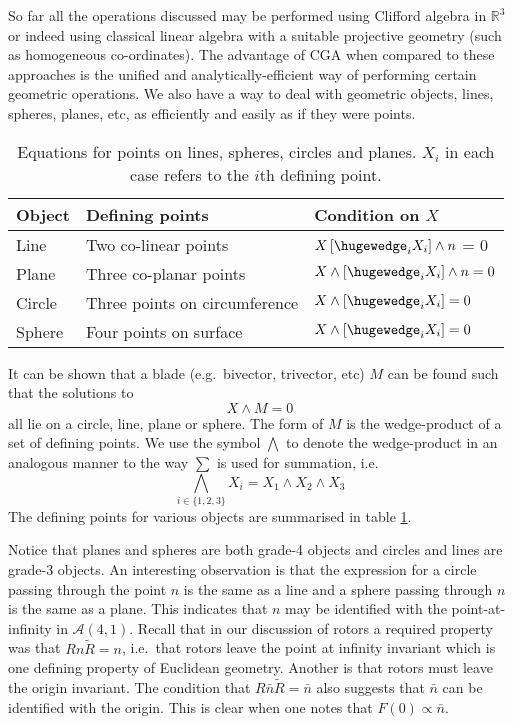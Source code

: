 So far all the operations discussed may be performed using Clifford algebra in
$\mathbb{R}^3$ or indeed using classical linear algebra with a suitable
projective geometry (such as homogeneous co-ordinates). The advantage of CGA
when compared to these approaches is the unified and analytically-efficient way
of performing certain geometric operations. We also have a way to deal with
geometric objects, lines, spheres, planes, etc, as efficiently and easily
as if they were points.

\begin{table}
\centering
\begin{tabular}{lll}
Object & Defining points & Condition on $X$ \\
\hline
Line & Two co-linear points & $X \left[\hugewedge_i X_i\right] \wedge n$ = 0\\
Plane & Three co-planar points &
$X \wedge \left[\hugewedge_i X_i\right] \wedge n =0 $ \\
Circle & Three points on circumference &
$X \wedge \left[\hugewedge_i X_i\right] = 0$ \\
Sphere & Four points on surface &
$X \wedge \left[\hugewedge_i X_i\right] = 0$ \\
\end{tabular}
\caption{Equations for points on lines, spheres, circles and planes. $X_i$ in each
case refers to the $i$th defining point.\label{tab:objects}}
\end{table}

It can be shown that a blade (e.g.\ bivector, trivector, etc)
$M$ can be found such that the solutions to
\[
X \wedge M = 0
\]
all lie on a circle, line, plane or sphere. The form of $M$ is the wedge-product of
a set of defining points. We use the symbol $\bigwedge$ to denote the
wedge-product in an analogous manner to the way $\sum$ is used for summation, i.e.
\[
\bigwedge_{i \in \{1,2,3\}} X_i = X_1 \wedge X_2 \wedge X_3
\]
The defining points for various objects are summarised in table \ref{tab:objects}. 

Notice that planes and spheres are both grade-4 objects and
circles and lines are grade-3 objects. An interesting observation is that the expression
for a circle passing through the point $n$ is the same as a line and a sphere passing
through $n$ is the same as a plane. This indicates that $n$ may be identified
with the point-at-infinity in $\mathcal{A}(4,1)$. Recall that in our discussion of
rotors a required property was that $Rn\tilde{R} = n$, i.e.\ that rotors leave the 
point at infinity invariant which is one defining property of Euclidean geometry.
Another is that rotors must leave the origin invariant. The condition that 
$R \bar{n} \tilde{R} = \bar{n}$ also suggests that $\bar{n}$ can be identified with the
origin. This is clear when one notes that $F(0) \propto \bar{n}$.


